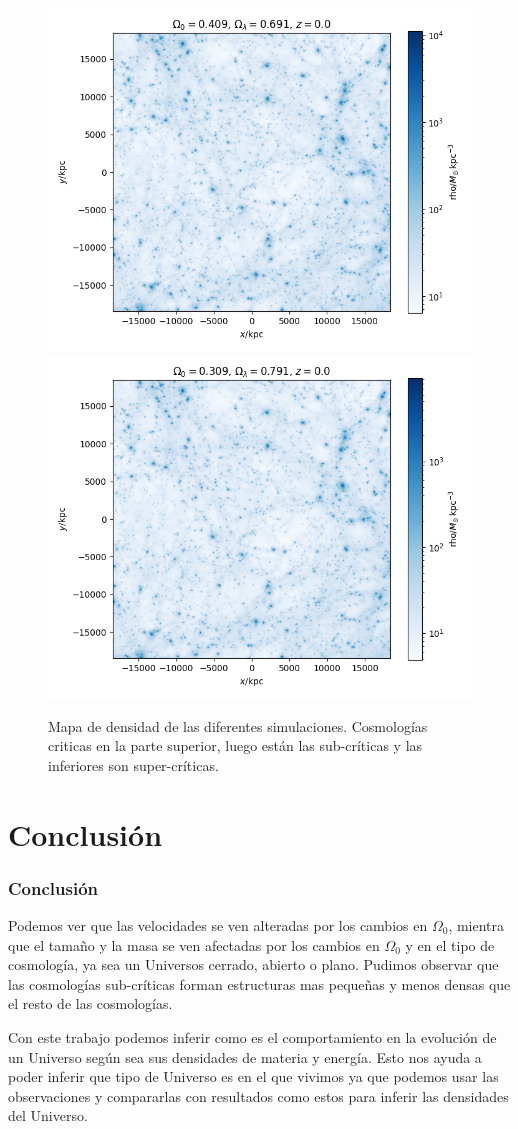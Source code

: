\documentclass{beamer}
\begin{document}
\begin{frame}
\begin{figure}[H]
	    \\
	    \includegraphics[width = 0.25\linewidth]{RunHigh0/RunHigh0Z0.png}    %
	    \includegraphics[width = 0.25\linewidth]{RunHighLam/RunHighLamZ0.png}  %
	    \caption{\footnotesize Mapa de densidad de las diferentes simulaciones. Cosmologías criticas en la parte superior, luego están las sub-críticas y las inferiores son super-críticas. }
    	\label{fig:DensityMap}
\end{figure}

\end{frame}




\section{Conclusión}
	\begin{frame}
		\frametitle{Conclusión}
Podemos ver que las velocidades se ven alteradas por los cambios en $\Omega_0$, mientra que el tamaño y la masa se ven afectadas por los cambios en $\Omega_0$ y en el tipo de cosmología, ya sea un Universos cerrado, abierto o plano. Pudimos observar que las cosmologías sub-críticas forman estructuras mas pequeñas y menos densas que el resto de las cosmologías.

Con este trabajo podemos inferir como es el comportamiento en la evolución de un Universo según sea sus densidades de materia y energía. Esto nos ayuda a poder inferir que tipo de Universo es en el que vivimos ya que podemos usar las observaciones y compararlas con resultados como estos para inferir las densidades del Universo.

	\end{frame}
\end{document}
